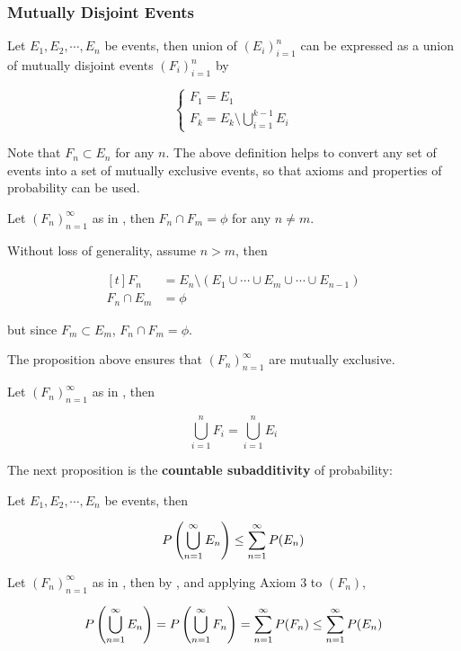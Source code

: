 \documentclass[a4paper,12pt]{article}
\begin{document}
\subsubsection{Mutually Disjoint Events}
\begin{dft}
  Let $E_{1},E_{2},\cdots,E_{n}$ be events, then union of $(E_{i})_{i=1}^{n}$ can be expressed as a union of mutually disjoint events $(F_{i})_{i=1}^{n}$ by

  $$\begin{cases}
    F_{1}=E_{1}\\
    F_{k}=E_{k}\setminus\bigcup_{i=1}^{k-1}E_{i}
  \end{cases}$$\s
\end{dft}\n

Note that $F_{n}\subset E_{n}$ for any $n$. The above definition helps to convert any set of events into a set of mutually exclusive events, so that axioms and properties of probability can be used.\n

\begin{pst}
  Let $(F_{n})_{n=1}^{\infty}$ as in \rdft[\sctd{1}], then $F_{n}\cap F_{m}=\phi$ for any $n\neq m$.\n

  \prf Without loss of generality, assume $n>m$, then

  $$\begin{aligned}[t]
    F_{n}&=E_{n}\setminus(E_{1}\cup\cdots\cup E_{m}\cup\cdots\cup E_{n-1})\\
    F_{n}\cap E_{m}&=\phi
  \end{aligned}$$\s

  but since $F_{m}\subset E_{m}$, $F_{n}\cap F_{m}=\phi$.
\end{pst}\n

The proposition above ensures that $(F_{n})_{n=1}^{\infty}$ are mutually exclusive.\n

\begin{pst}
  Let $(F_{n})_{n=1}^{\infty}$ as in \rdft[\sctd{2}], then
  
  $$\bigcup_{i=1}^{n}F_{i}=\bigcup_{i=1}^{n}E_{i}$$\s
\end{pst}

The next proposition is the \textbf{countable subadditivity} of probability:\n

\begin{pst}
  Let $E_{1},E_{2},\cdots,E_{n}$ be events, then

  $$P\left( \bigcup_{n=1}^{\infty}E_{n}\right)\leq\sum_{n=1}^{\infty}P(E_{n})$$\s

  \prf Let $(F_{n})_{n=1}^{\infty}$ as in \rdft[\sctd{3}], then by \rpst[\sctd{2}], \rpst[\sctd{1}] and applying Axiom $3$ to $(F_{n})$,

  $$P\left( \bigcup_{n=1}^{\infty}E_{n}\right)=P\left( \bigcup_{n=1}^{\infty}F_{n}\right)=\sum_{n=1}^{\infty}P(F_{n})\leq\sum_{n=1}^{\infty}P(E_{n})$$
\end{pst}\n
\end{document}

